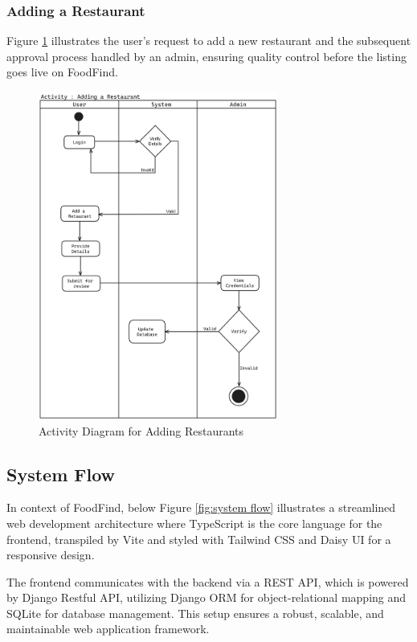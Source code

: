 \documentclass[12pt, a4paper, oneside]{article}
\begin{document}
\subsubsection{Adding a Restaurant}
Figure \ref{fig:addres} illustrates the user’s request to add a new restaurant and the subsequent approval process handled by an admin, ensuring quality control before the listing goes live on FoodFind.
\vspace{2mm}
\begin{figure}[h]
	\includegraphics[width=0.7\textwidth]{images/adding.png}
	\centering
	\caption{Activity Diagram for Adding Restaurants}
	\label{fig:addres}
\end{figure}
\pagebreak


\subsection{System Flow}
In context of FoodFind, below Figure \ref{fig:system flow} illustrates a streamlined web development architecture where TypeScript is the core language for the frontend, transpiled by Vite and styled with Tailwind CSS and Daisy UI for a responsive design. 

The frontend communicates with the backend via a REST API, which is powered by Django Restful API, utilizing Django ORM for object-relational mapping and SQLite for database management. This setup ensures a robust, scalable, and maintainable web application framework.
\vspace{2mm}
\end{document}
